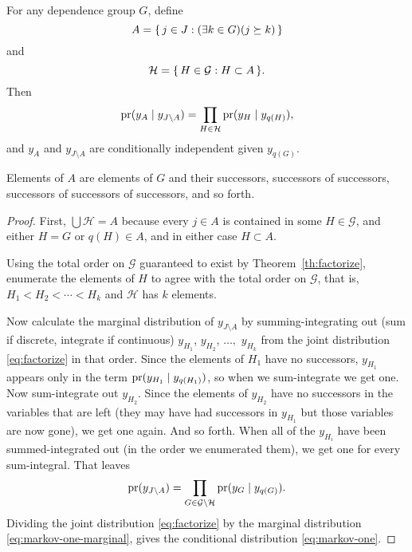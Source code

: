 \begin{theorem} \label{th:markov-one}
For any dependence group $G$, define
$$
   A = \{\,  j \in J : (\exists k \in G)(j \succeq k)  \,\}
$$
and
$$
   \mathcal{H} = \{\,  H \in \mathcal{G} : H \subset A  \,\}.
$$
Then
\begin{equation} \label{eq:markov-one}
   \operatorname{pr}(y_{A} \mid y_{J \setminus A})
   =
   \prod_{H \in \mathcal{H}} \operatorname{pr}(y_H \mid y_{q(H)}),
\end{equation}
and $y_A$ and $y_{J \setminus A}$ are conditionally
independent given $y_{q(G)}$.
\end{theorem}
Elements of $A$ are elements of $G$ and their successors,
successors of successors, successors of successors of successors, and so forth.
\begin{proof}
First, $\bigcup \mathcal{H} = A$ because every $j \in A$ is contained in
some $H \in \mathcal{G}$, and either $H = G$ or $q(H) \in A$, and in either
case $H \subset A$.

Using the total order on $\mathcal{G}$ guaranteed to exist
by Theorem~\ref{th:factorize}, enumerate the elements of $H$
to agree with the total order on $\mathcal{G}$, that is,
$H_1 < H_2 < \cdots < H_k$ and $\mathcal{H}$ has $k$ elements.

Now calculate the marginal distribution of $y_{J \setminus A}$ by
summing-integrating out (sum if discrete, integrate if continuous)
$y_{H_1}$, $y_{H_2}$, $\ldots,$ $y_{H_k}$
from the joint distribution \eqref{eq:factorize} in that order.
Since the elements of $H_1$ have no successors, $y_{H_1}$ appears only in
the term $\operatorname{pr}(y_{H_1} \mid y_{q(H_1)})$, so when we sum-integrate we get one.
Now sum-integrate out $y_{H_2}$.  Since the elements of $y_{H_2}$ have no
successors in the variables that are left (they may have had successors in
$y_{H_1}$ but those variables are now gone), we get one again.  And so forth.
When all of the $y_{H_i}$ have been summed-integrated out (in the order we
enumerated them), we get one for every sum-integral.  That leaves
\begin{equation} \label{eq:markov-one-marginal}
   \operatorname{pr}(y_{J \setminus A})
   =
   \prod_{G \in \mathcal{G} \setminus \mathcal{H}} \operatorname{pr}(y_G \mid y_{q(G)}).
\end{equation}
Dividing the joint distribution \eqref{eq:factorize} by the marginal
distribution \eqref{eq:markov-one-marginal}, gives
the conditional distribution \eqref{eq:markov-one}.


\end{proof}
